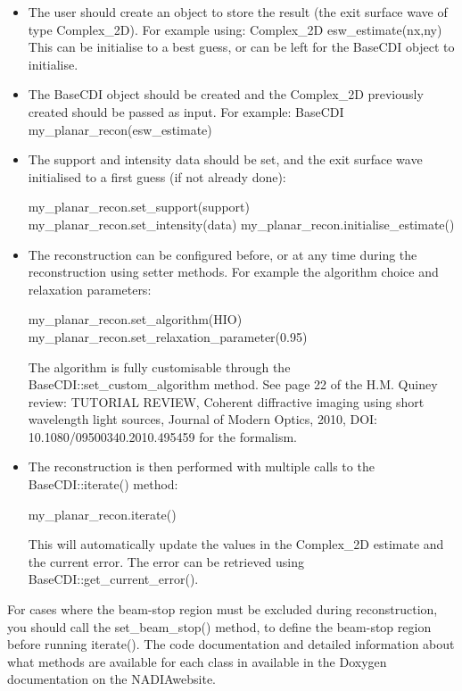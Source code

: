 \documentclass[]{nadia}
\def\name{NADIA}
\begin{document}
\begin{itemize}

  \item The user should create an object to store the result (the exit
    surface wave of type Complex\_2D). For example using: Complex\_2D
    esw\_estimate(nx,ny) This can be initialise to a best guess, or can
    be left for the BaseCDI object to initialise.

  \item The BaseCDI object should be created and the Complex\_2D
    previously created should be passed as input. For example: BaseCDI
    my\_planar\_recon(esw\_estimate)

  \item The support and intensity data should be set, and the exit
    surface wave initialised to a first guess (if not already done):
    \begin{myverbatim}
    my_planar_recon.set_support(support) 
    my_planar_recon.set_intensity(data) 
    my_planar_recon.initialise_estimate()
    \end{myverbatim}

  \item The reconstruction can be configured before, or at any time
    during the reconstruction using setter methods. For example the
    algorithm choice and relaxation parameters:
    \begin{myverbatim}
    my_planar_recon.set_algorithm(HIO) 
    my_planar_recon.set_relaxation_parameter(0.95) 
    \end{myverbatim}
    The algorithm is fully customisable through the
    BaseCDI::set\_custom\_algorithm method. See page 22 of the H.M. Quiney
    review: TUTORIAL REVIEW, Coherent diffractive imaging using short
    wavelength light sources, Journal of Modern Optics, 2010, DOI:
    10.1080/09500340.2010.495459 for the formalism.

  \item The reconstruction is then performed with multiple calls to the
    BaseCDI::iterate() method:
    \begin{myverbatim}
    my_planar_recon.iterate() 
    \end{myverbatim}
    This will automatically update the values in the Complex\_2D estimate
    and the current error. The error can be retrieved using
    BaseCDI::get\_current\_error().
\end{itemize}

For cases where the beam-stop region must be excluded during
reconstruction, you should call the set\_beam\_stop() method, to define
the beam-stop region before running iterate(). The code documentation and detailed information about what methods are available for each class in available in the Doxygen documentation on the \name website.
\end{document}

